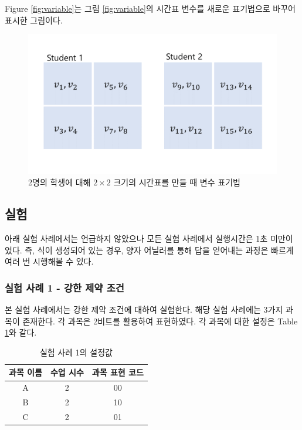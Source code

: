 \documentclass{article}
\begin{document}
Figure \ref{fig:variable}는 그림 \ref{fig:variable}의 시간표 변수를 새로운 표기법으로 바꾸어 표시한 그림이다.

    \begin{figure}[htb!]
        \centering
        \includegraphics[width=0.8\columnwidth]{images/var2.png}
        \caption{2명의 학생에 대해 $2 \times 2$ 크기의 시간표를 만들 때 변수 표기법}
        \label{fig:newvar}
    \end{figure}

    \subsection{실험}

아래 실험 사례에서는 언급하지 않았으나 모든 실험 사례에서 실행시간은 1초 미만이었다. 즉, 식이 생성되어 있는 경우, 양자 어닐러를 통해 답을 얻어내는 과정은 빠르게 여러 번 시행해볼 수 있다.

    \subsubsection{실험 사례 1 - 강한 제약 조건}

본 실험 사례에서는 강한 제약 조건에 대하여 실험한다. 해당 실험 사례에는 3가지 과목이 존재한다. 각 과목은 2비트를 활용하여 표현하였다. 각 과목에 대한 설정은 Table \ref{tab:testcase1}와 같다.

    \begin{table}[htb!]
        \centering
        \begin{tabular}{c c c}
             \hline
             과목 이름 & 수업 시수 & 과목 표현 코드\\
             \hline
             A & 2 & 00 \\
             B & 2 & 10 \\
             C & 2 & 01 \\
             \hline
        \end{tabular}
        \caption{실험 사례 1의 설정값}\label{tab:testcase1}
    \end{table}
\end{document}
